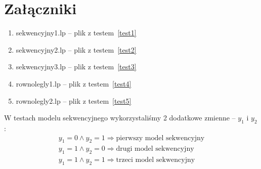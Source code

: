 
\section{Załączniki}

\begin{enumerate}
\item sekwencyjny1.lp -- plik z testem~\ref{test1}
\item sekwencyjny2.lp -- plik z testem~\ref{test2}
\item sekwencyjny3.lp -- plik z testem~\ref{test3}
\item rownolegly1.lp -- plik z testem~\ref{test4}
\item rownolegly2.lp -- plik z testem~\ref{test5}
\end{enumerate}

\vspace{1.4 cm}
W testach modelu sekwencyjnego wykorzystaliśmy 2 dodatkowe zmienne -- $y_{1}$ i $y_{2}$:
\begin{equation} \label{eq:y1y2}
\begin{array}{l}
y_{1} = 0 \land y_{2} = 1 \Rightarrow \text{pierwszy model sekwencyjny} \\
y_{1} = 1 \land y_{2} = 0 \Rightarrow \text{drugi model sekwencyjny} \\
y_{1} = 1 \land y_{2} = 1 \Rightarrow \text{trzeci model sekwencyjny}
\end{array}
\end{equation}

\newpage
